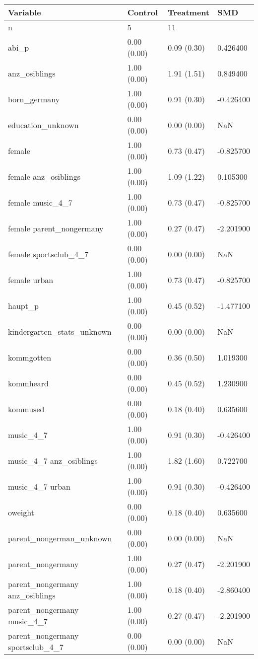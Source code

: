 \begin{tabular}{llll}
\toprule
Variable & Control & Treatment & SMD \\
\midrule
n & 5 & 11 &  \\
abi\_p & 0.00 (0.00) & 0.09 (0.30) & 0.426400 \\
anz\_osiblings & 1.00 (0.00) & 1.91 (1.51) & 0.849400 \\
born\_germany & 1.00 (0.00) & 0.91 (0.30) & -0.426400 \\
education\_unknown & 0.00 (0.00) & 0.00 (0.00) & NaN \\
female & 1.00 (0.00) & 0.73 (0.47) & -0.825700 \\
female anz\_osiblings & 1.00 (0.00) & 1.09 (1.22) & 0.105300 \\
female music\_4\_7 & 1.00 (0.00) & 0.73 (0.47) & -0.825700 \\
female parent\_nongermany & 1.00 (0.00) & 0.27 (0.47) & -2.201900 \\
female sportsclub\_4\_7 & 0.00 (0.00) & 0.00 (0.00) & NaN \\
female urban & 1.00 (0.00) & 0.73 (0.47) & -0.825700 \\
haupt\_p & 1.00 (0.00) & 0.45 (0.52) & -1.477100 \\
kindergarten\_stats\_unknown & 0.00 (0.00) & 0.00 (0.00) & NaN \\
kommgotten & 0.00 (0.00) & 0.36 (0.50) & 1.019300 \\
kommheard & 0.00 (0.00) & 0.45 (0.52) & 1.230900 \\
kommused & 0.00 (0.00) & 0.18 (0.40) & 0.635600 \\
music\_4\_7 & 1.00 (0.00) & 0.91 (0.30) & -0.426400 \\
music\_4\_7 anz\_osiblings & 1.00 (0.00) & 1.82 (1.60) & 0.722700 \\
music\_4\_7 urban & 1.00 (0.00) & 0.91 (0.30) & -0.426400 \\
oweight & 0.00 (0.00) & 0.18 (0.40) & 0.635600 \\
parent\_nongerman\_unknown & 0.00 (0.00) & 0.00 (0.00) & NaN \\
parent\_nongermany & 1.00 (0.00) & 0.27 (0.47) & -2.201900 \\
parent\_nongermany anz\_osiblings & 1.00 (0.00) & 0.18 (0.40) & -2.860400 \\
parent\_nongermany music\_4\_7 & 1.00 (0.00) & 0.27 (0.47) & -2.201900 \\
parent\_nongermany sportsclub\_4\_7 & 0.00 (0.00) & 0.00 (0.00) & NaN \\

\end{tabular}
